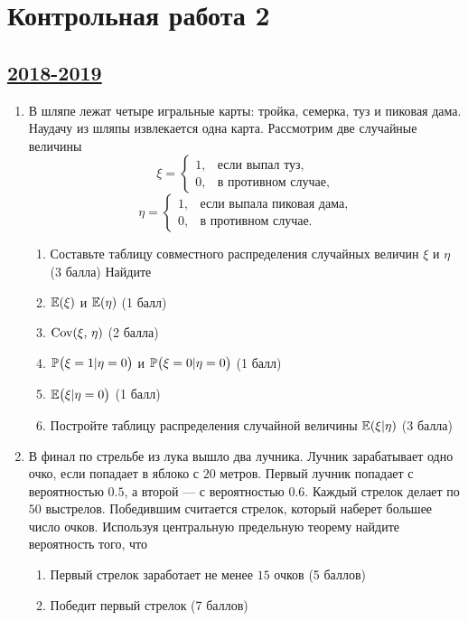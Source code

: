 \newpage
\thispagestyle{empty}
\section{Контрольная работа 2}

\subsection[2018-2019]{\hyperref[sec:sol_kr_02_2018_2019]{2018-2019}}
\label{sec:kr_02_2018_2019}

\begin{enumerate}

    \item В шляпе лежат четыре игральные карты: тройка, семерка, туз и пиковая дама.
    Наудачу из шляпы извлекается одна карта. Рассмотрим две случайные величины
\[
    \xi = \left\{
                \begin{array}{ll}
                    1, & \text{если выпал туз,} \\
                    0, & \text{в противном случае,}
            \end{array}
            \right.
\]
\[
    \eta = \left\{
                \begin{array}{ll}
                    1, & \text{если выпала пиковая дама,} \\
                    0, & \text{в противном случае.}
            \end{array}
            \right.
\]
\begin{enumerate}
  \item Составьте таблицу совместного распределения случайных величин $\xi$ и $\eta$ (3 балла)
\newline Найдите
  \item $\E(\xi)$ и $\E(\eta)$ (1 балл)
  \item $\Cov(\xi, \, \eta)$ (2 балла)
  \item $\P\bigl(\xi = 1 | \eta = 0\bigr)$ и $\P\bigl(\xi = 0 | \eta = 0\bigr)$ (1 балл)
  \item $\E\bigl(\xi | \eta = 0 \bigr)$ (1 балл)
  \item Постройте таблицу распределения случайной величины $\E(\xi|\eta)$ (3 балла)
\end{enumerate}
    \item В финал по стрельбе из лука вышло два лучника. Лучник зарабатывает одно
    очко, если попадает в яблоко с $20$ метров. Первый лучник попадает
    с вероятностью $0.5$, а второй — с вероятностью $0.6$. Каждый стрелок делает
    по $50$ выстрелов. Победившим считается стрелок, который наберет большее число очков.
    Используя центральную предельную теорему найдите вероятность того, что
\begin{enumerate}
  \item Первый стрелок заработает не менее $15$ очков (5 баллов)
  \item Победит первый стрелок (7 баллов)
\end{enumerate}



\end{enumerate}
